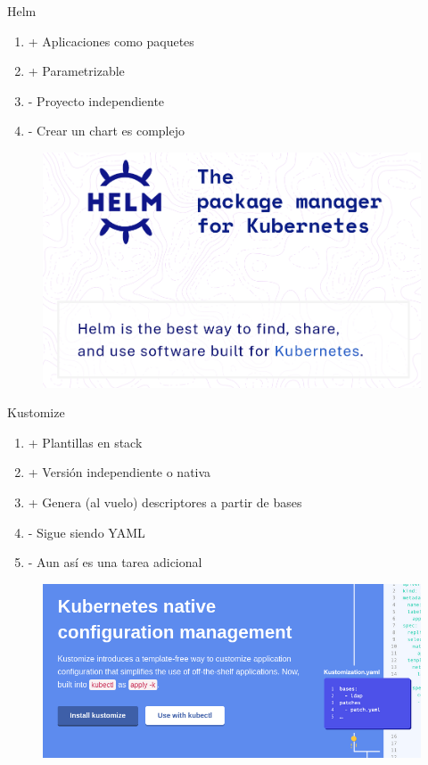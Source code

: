 \documentclass[aspectratio=169]{beamer}
\begin{document}
\begin{frame}{Helm}

		\begin{enumerate}
			\item + Aplicaciones como paquetes
			\item + Parametrizable
			\item - Proyecto independiente
            \item - Crear un chart es complejo
		\end{enumerate}
        
        \begin{figure}
        \centering
        \includegraphics[width=0.6\linewidth]{Images/helm}
        \end{figure}


\end{frame}


\begin{frame}{Kustomize}

		\begin{enumerate}
			\item + Plantillas en stack
			\item + Versión independiente o nativa
            \item + Genera (al vuelo) descriptores a partir de bases
			\item - Sigue siendo YAML
            \item - Aun así es una tarea adicional
		\end{enumerate}
        
\begin{figure}
\centering
\includegraphics[width=0.6\linewidth]{Images/kustomize}
\end{figure}


\end{frame}
\end{document}
